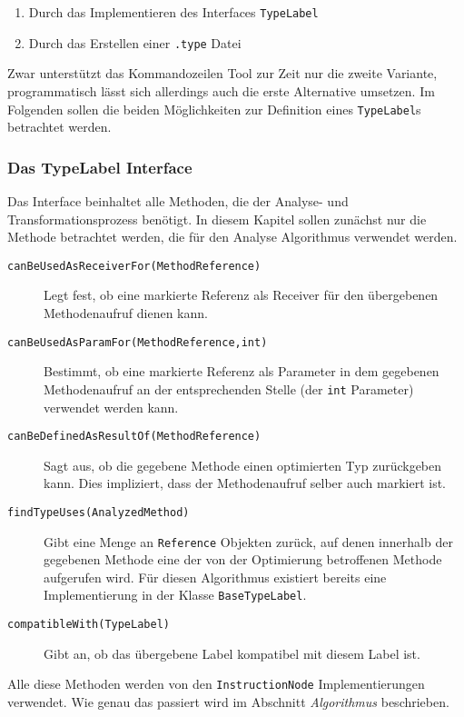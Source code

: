 \begin{enumerate} 
	\item Durch das Implementieren des Interfaces \texttt{TypeLabel}
	\item Durch das Erstellen einer \texttt{.type} Datei
\end{enumerate}

Zwar unterstützt das Kommandozeilen Tool zur Zeit nur die zweite Variante,
programmatisch lässt sich allerdings auch die erste Alternative umsetzen. Im 
Folgenden sollen die beiden Möglichkeiten zur Definition eines \texttt{TypeLabel}s
betrachtet werden.

\subsubsection{Das TypeLabel Interface}

Das Interface beinhaltet alle Methoden, die der Analyse- und Transformationsprozess
benötigt. In diesem Kapitel sollen zunächst nur die Methode betrachtet werden, die
für den Analyse Algorithmus verwendet werden. 

\begin{description}
	\item[\texttt{canBeUsedAsReceiverFor(MethodReference)}] Legt fest, ob eine 
	markierte Referenz als Receiver für den übergebenen Methodenaufruf dienen kann.
	\item[\texttt{canBeUsedAsParamFor(MethodReference,int)}] Bestimmt, ob eine 
	markierte Referenz als Parameter in dem gegebenen Methodenaufruf an der 
	entsprechenden Stelle (der \texttt{int} Parameter) verwendet werden kann.
	\item[\texttt{canBeDefinedAsResultOf(MethodReference)}] Sagt aus, ob die 
	gegebene Methode einen optimierten Typ zurückgeben kann. Dies impliziert, dass
	der Methodenaufruf selber auch markiert ist.
	\item[\texttt{findTypeUses(AnalyzedMethod)}] Gibt eine Menge an \texttt{Reference}
	Objekten zurück, auf denen innerhalb der gegebenen Methode eine der von 
	der Optimierung betroffenen Methode aufgerufen wird. Für diesen Algorithmus 
	existiert bereits eine Implementierung in der Klasse \texttt{BaseTypeLabel}.
	\item[\texttt{compatibleWith(TypeLabel)}] Gibt an, ob das übergebene Label 
	kompatibel mit diesem Label ist.
\end{description}

Alle diese Methoden werden von den \texttt{InstructionNode} Implementierungen 
verwendet. Wie genau das passiert wird im Abschnitt \textit{Algorithmus} beschrieben.

